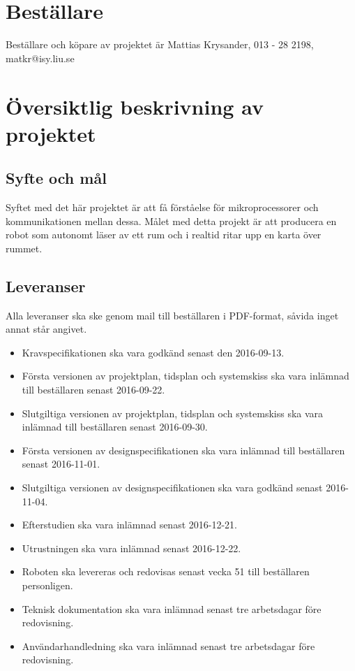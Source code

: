 \documentclass{article}
\begin{document}
\renewcommand*\contentsname{Innehållsförteckning}
\tableofcontents
\clearpage

\section{Beställare}
Beställare och köpare av projektet är Mattias Krysander, 013 - 28 2198, matkr@isy.liu.se

\section{Översiktlig beskrivning av projektet}

\subsection{Syfte och mål}
Syftet med det här projektet är att få förståelse för mikroprocessorer och kommunikationen mellan
dessa. Målet med detta projekt är att producera en robot som autonomt läser av ett rum och i realtid  ritar upp en karta över rummet.

\subsection{Leveranser}
Alla leveranser ska ske genom mail till beställaren i PDF-format, såvida inget annat står angivet. 

\begin{itemize}
    \item Kravspecifikationen ska vara godkänd senast den 2016-09-13. 
    \item Första versionen av projektplan, tidsplan och systemskiss ska vara inlämnad till beställaren senast 2016-09-22. 
    \item Slutgiltiga versionen av projektplan, tidsplan och systemskiss ska vara inlämnad till beställaren senast 2016-09-30. 
    \item Första versionen av designspecifikationen ska vara inlämnad till beställaren senast 2016-11-01. 
    \item Slutgiltiga versionen av designspecifikationen ska vara godkänd senast 2016-11-04.
    \item Efterstudien ska vara inlämnad senast 2016-12-21. 
    \item Utrustningen ska vara inlämnad senast 2016-12-22.
    \item Roboten ska levereras och redovisas senast vecka 51 till beställaren personligen.
    \item Teknisk dokumentation ska vara inlämnad senast tre arbetsdagar före redovisning.
    \item Användarhandledning ska vara inlämnad senast tre arbetsdagar före redovisning.
\end{itemize}
\end{document}
